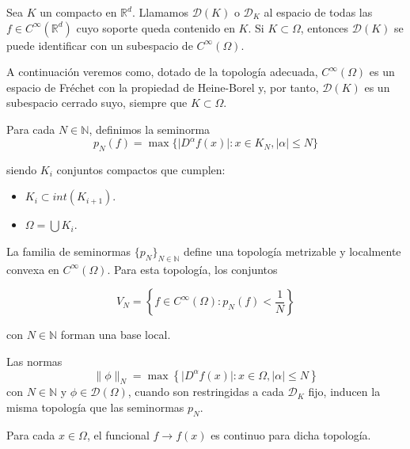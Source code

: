 \begin{definicion}
Sea $K$ un compacto en $\mathds{R}^{d}$. Llamamos $\mathcal{D}(K)$ o $\mathcal{D}_K$ al espacio de todas las $f\in C^{\infty}(\mathds{R}^{d})$ cuyo soporte queda contenido en $K$. Si $K\subset\Omega$, entonces $\mathcal{D}(K)$ se puede identificar con un subespacio de $C^{\infty}(\Omega)$.

A continuación veremos como, dotado de la topología adecuada, $C^{\infty}(\Omega)$ es un espacio de Fréchet con la propiedad de Heine-Borel y, por tanto, $\mathcal{D}(K)$ es un subespacio cerrado suyo, siempre que $K\subset\Omega$.


Para cada $N\in\mathds{N}$, definimos la seminorma 
\begin{equation}
p_{N}(f) = \max \{ \vert D^{\alpha}f(x)\vert : x\in K_{N}, \vert\alpha\vert \leq N\}
\end{equation}

siendo $K_{i}$ conjuntos compactos que cumplen:
\begin{itemize}
	\item $K_{i} \subset int(K_{i+1})$.
	\item $\Omega = \bigcup K_{i}$.	
\end{itemize}
\end{definicion}

\begin{lema}
La familia de seminormas $\{p_{N}\}_{N\in\mathds{N}}$ define una topología metrizable y localmente convexa en $C^{\infty}(\Omega)$. Para esta topología, los conjuntos 

\begin{equation}
 V_{N} = \left\{ f \in C^{\infty}(\Omega): p_{N}(f) < \frac{1}{N}\right\}
\end{equation}

con $N\in\mathds{N}$ forman una base local.
\end{lema}


\begin{observacion}
    Las normas 
\begin{equation}
    \parallel \phi \parallel_N = \max \left\{ \vert D^{\alpha}f(x)\vert : x\in \Omega, \vert\alpha\vert \leq N\right\}
\end{equation}
con $N\in\mathds{N}$ y $\phi\in\mathcal{D}(\Omega)$, cuando son restringidas a cada $\mathcal{D}_K$ fijo, inducen la misma topología que las seminormas $p_N$.
\end{observacion}
\begin{observacion}
Para cada $x\in\Omega$, el funcional $f\rightarrow f(x)$ es continuo para dicha topología.
\end{observacion}


